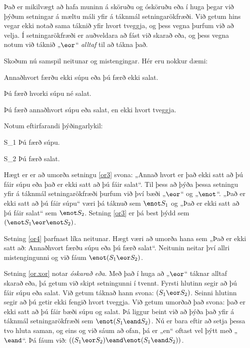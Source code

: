 Það er mikilvægt að hafa muninn á sköruðu og ósköruðu eða í huga þegar við þýðum setningar á mæltu máli yfir á táknmál setningarökfræði. Við getum hins vegar ekki notað sama táknið yfir hvort tveggja, og þess vegna þurfum við að velja. Í setningarökfræði er auðveldara að fást við skarað eða, og þess vegna notum við táknið „$\eor$“ \emph{alltaf} til að tákna það. 

Skoðum nú samspil neitunar og mistengingar. Hér eru nokkur dæmi:
	\begin{earg}
		\item[\ex{or3}] Annaðhvort færðu ekki súpu eða þú færð ekki salat.
		\item[\ex{or4}] Þú færð hvorki súpu né salat.
		\item[\ex{or.xor}] Þú færð annaðhvort súpu eða salat, en ekki hvort tveggja.
	\end{earg}

Notum eftirfarandi þýðingarlykil:	
	\begin{ekey}
		\item[S_1] Þú færð súpu.
		\item[S_2] Þú færð salat.
	\end{ekey}
Hægt er er að umorða setningu \ref{or3} svona: „Annað hvort er það ekki satt að þú fáir súpu eða það er ekki satt að þú fáir salat“. Til þess að þýða þessa setningu yfir á táknmál setningarökfræði þurfum við því bæði „$\eor$“ og „$\enot$“. „Það er ekki satt að þú fáir súpu“ væri þá táknuð sem $\enot S_1$ og „Það er ekki satt að þú fáir salat“ sem $\enot S_2$. Setning \ref{or3} er þá best þýdd sem $(\enot S_1 \eor \enot S_2)$.
	
Setning \ref{or4} þarfnast líka neitunar. Hægt væri að umorða hana sem „Það er ekki satt að: Annaðhvort færðu súpu eða þú færð salat“. Neitunin neitar því allri mistengingunni og við fáum $\enot (S_1 \eor S_2)$.

Setning \ref{or.xor} notar \emph{óskarað eða}. Með það í huga að „$\eor$“ táknar alltaf skarað eða, þá getum við skipt setningunni í tvennt. Fyrsti hlutinn segir að þú fáir súpu eða salat. Við getum táknað hann svona: $(S_1 \eor S_2)$. Seinni hlutinn segir að þú getir ekki fengið hvort tveggja. Við getum umorðað það svona: það er ekki satt að þú fáir bæði súpu og salat. Þá liggur beint við að þýða það yfir á táknmál setningarökfræði sem $\enot(S_1 \eand S_2)$. Nú er bara eftir að setja þessa tvo hluta saman, og eins og við sáum að ofan, þá er „en“ oftast vel þýtt með „$\eand$“. Þá fáum við: $((S_1 \eor S_2) \eand \enot(S_1 \eand S_2))$.
	
